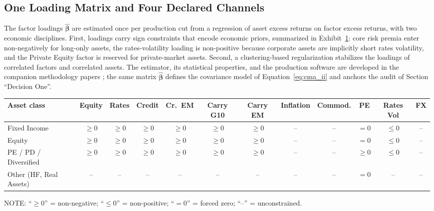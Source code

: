 \documentclass[pdftex,12pt,a4paper]{article}
\begin{document}
\subsection*{One Loading Matrix and Four Declared Channels}\label{subsec:loadings}

The factor loadings $\hat{\boldsymbol\beta}$ are estimated once per production cut from a regression of asset excess returns on factor excess returns, with two economic disciplines. First, loadings carry sign constraints that encode economic priors, summarized in Exhibit~\ref{tab:sign_constraints}: core risk premia enter non-negatively for long-only assets, the rates-volatility loading is non-positive because corporate assets are implicitly short rates volatility, and the Private Equity factor is reserved for private-market assets. Second, a clustering-based regularization stabilizes the loadings of correlated factors and correlated assets. The estimator, its statistical properties, and the production software are developed in the companion methodology papers \citep{SeppFactorLassoCSDA2026,SeppFactorLassoJSS2026}; the same matrix $\hat{\boldsymbol\beta}$ defines the covariance model of Equation~\eqref{eq:cma_ii} and anchors the audit of Section ``Decision One''.

\begin{table}[H]
	\label{tab:sign_constraints}\vspace*{-1.0\baselineskip}
	\begin{center}
		\begin{adjustbox}{max width=\textwidth}
			\begin{tabular}{l*{11}{c}}
				\toprule
				\textbf{Asset class} & \textbf{Equity} & \textbf{Rates} & \textbf{Credit} & \textbf{Cr.\ EM} & \textbf{Carry G10} & \textbf{Carry EM} & \textbf{Inflation} & \textbf{Commod.} & \textbf{PE} & \textbf{Rates Vol} & \textbf{FX} \\
				\midrule
				Fixed Income & $\geq 0$ & $\geq 0$ & $\geq 0$ & $\geq 0$ & $\geq 0$ & $\geq 0$ & -- & -- & $= 0$ & $\leq 0$ & -- \\
				Equity & $\geq 0$ & $\geq 0$ & $\geq 0$ & $\geq 0$ & $\geq 0$ & $\geq 0$ & -- & -- & $= 0$ & $\leq 0$ & -- \\
				PE / PD / Diversified & $\geq 0$ & $\geq 0$ & $\geq 0$ & $\geq 0$ & $\geq 0$ & $\geq 0$ & -- & -- & $\geq 0$ & $\leq 0$ & -- \\
				Other (HF, Real Assets) & -- & -- & -- & -- & -- & -- & -- & -- & $= 0$ & -- & -- \\
				\bottomrule
			\end{tabular}
		\end{adjustbox}
	\end{center}
	\small
	NOTE: ``$\geq 0$'' = non-negative; ``$\leq 0$'' = non-positive; ``$= 0$'' = forced zero; ``--'' = unconstrained.
\end{table}
\end{document}
